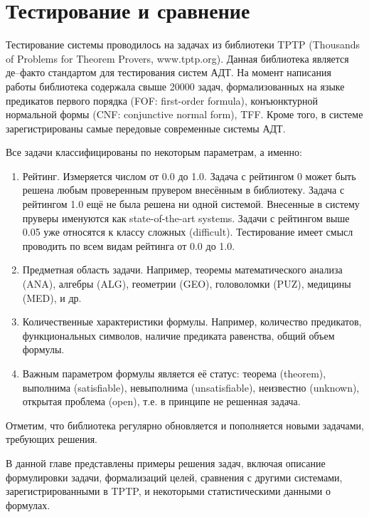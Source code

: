 \section{Тестирование и сравнение}

Тестирование системы проводилось на задачах из библиотеки TPTP (Thousands of Problems for Theorem Provers, www.tptp.org). Данная библиотека является де--факто стандартом для тестирования систем АДТ. На момент написания работы библиотека содержала свыше 20000 задач, формализованных на языке предикатов первого порядка (FOF: first-order formula), конъюнктурной нормальной формы (CNF: conjunctive normal form), TFF. Кроме того, в системе зарегистрированы самые передовые современные системы АДТ.

Все задачи классифицированы по некоторым параметрам, а именно:
\begin{enumerate}
\item Рейтинг. Измеряется числом от 0.0 до 1.0. Задача с рейтингом 0 может быть решена любым проверенным прувером внесённым в библиотеку. Задача с рейтингом 1.0 ещё не была решена ни одной системой. Внесенные в систему пруверы именуются как state-of-the-art systems. Задачи с рейтингом выше 0.05 уже относятся к классу сложных (difficult). Тестирование имеет смысл проводить по всем видам рейтинга от 0.0 до 1.0.
\item Предметная область задачи. Например, теоремы математического анализа (ANA), алгебры (ALG), геометрии (GEO), головоломки (PUZ), медицины (MED), и др.
\item Количественные характеристики формулы. Например, количество предикатов, функциональных символов, наличие предиката равенства, общий объем формулы.
\item Важным параметром формулы является её статус: теорема (theorem), выполнима (satisfiable), невыполнима (unsatisfiable), неизвестно (unknown), открытая проблема (open), т.е. в принципе не решенная задача.
\end{enumerate}

Отметим, что библиотека регулярно обновляется и пополняется новыми задачами, требующих решения.


В данной главе представлены примеры решения задач, включая описание формулировки задачи, формализаций целей, сравнения с другими системами, зарегистрированными в TPTP, и некоторыми статистическими данными о формулах.


